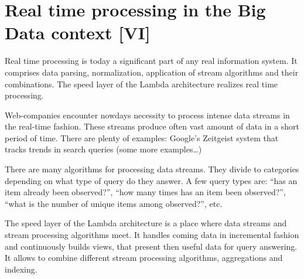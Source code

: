 \chapter{Real time processing in the Big Data context [VI]}
\label{chap:real_time_processing}

Real time processing is today a significant part of any real information system.
It comprises data parsing, normalization, application of stream algorithms and their combinations.
The speed layer of the Lambda architecture realizes real time processing.

Web-companies encounter nowdays necessity to process intense data streams in the real-time fashion.
These streams produce often vast amount of data in a short period of time.
There are plenty of examples: Google's Zeitgeist system that tracks trends in search queries (some more examples\ldots)

There are many algorithms for processing data streams.
They divide to categories depending on what type of query do they answer.
A few query types are: ``has an item already been observed?'', ``how many times has an item been observed?'', ``what is the number of unique items among observed?'', etc.

The speed layer of the Lambda architecture is a place where data streams and stream processing algorithms meet.
It handles coming data in incremental fashion and continuously builds views, that present then useful data for query answering.
It allows to combine different stream processing algorithms, aggregations and indexing.  




